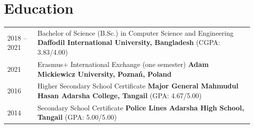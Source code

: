 \section{\textbf{Education}}
\begin{tabularx}{\linewidth}{@{}l X@{}}
    2018 -- 2021 & Bachelor of Science (B.Sc.) in Computer Science
    and Engineering
    \newline
    \textbf{Daffodil International University, Bangladesh} \hfill (CGPA: 3.83/4.00)
    \\

    2021 & Erasmus+ International Exchange (one semester)
    \newline
    \textbf{Adam Mickiewicz University, Pozna\'n, Poland}
    \\

    2016 & Higher Secondary School Certificate
    \newline
    \textbf{Major General Mahmudul Hasan Adarsha College, Tangail} \hfill (GPA:
    4.67/5.00) \\

    2014 & Secondary School Certificate
    \newline
    \textbf{Police Lines Adarsha High School, Tangail} \hfill (GPA: 5.00/5.00)
    \\
\end{tabularx}

